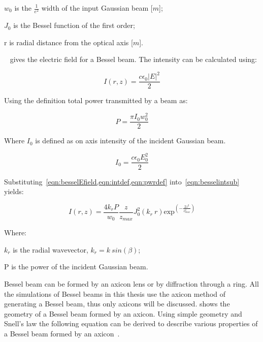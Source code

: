     \indent $w_0$ is the $\tfrac{1}{e^2}$ width of the input Gaussian beam [$m$]; 

    \indent $J_0$ is the Bessel function of the first order; 

    \indent r is radial distance from the optical axis [$m$]. 

\medskip


~ gives the electric field for a Bessel beam. The intensity can be calculated using:

\begin{equation}
    I(r,z)=\frac{c\epsilon_0\left|E\right|^2}{2}
    \label{eqn:besselintsub}
\end{equation}

Using the definition total power transmitted by a beam as:

\begin{equation}
    P=\frac{\pi I_0w_0^2}{2}
    \label{eqn:pwrdef}
\end{equation}

Where $I_0$ is defined as on axis intensity of the incident Gaussian beam.

\begin{equation}
    I_0=\frac{c\epsilon_0E_0^2}{2}
    \label{eqn:intdef}
\end{equation}

Substituting~\cref{eqn:besselEfield,eqn:intdef,eqn:pwrdef} into~\cref{eqn:besselintsub} yields:

\begin{equation}
    I(r,z)=\frac{4k_rP}{w_0}\frac{z}{z_{max}}J_0^2\left(k_r\ r\right)\text{exp}^{\left(-\frac{2z^2}{z^2_{max}}\right)}
    \label{eqn:besselInt}
\end{equation}


\noindent Where:

    \indent $k_r$ is the radial wavevector, $k_r=k\ sin(\beta)$;

    \indent P is the power of the incident Gaussian beam.

    \medskip

Bessel beam can be formed by an axicon lens or by diffraction through a ring.
All the simulations of Bessel beams in this thesis use the axicon method of generating a Bessel beam, thus only axicons will be discussed.
 shows the geometry of a Bessel beam formed by an axicon.
Using simple geometry and Snell's law the following equation can be derived to describe various properties of a Bessel beam formed by an axicon~\cite{merola2012characterization}.

